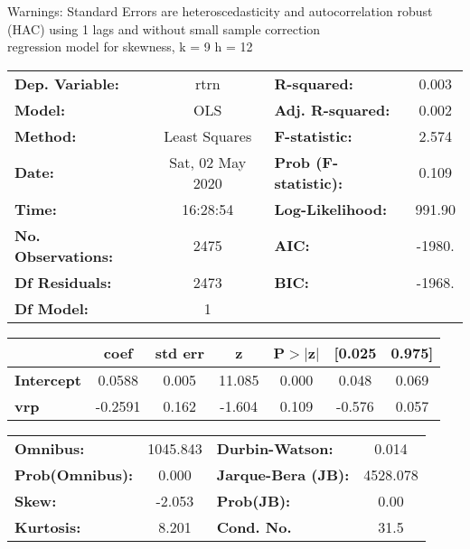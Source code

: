 Warnings: \newline
 [1] Standard Errors are heteroscedasticity and autocorrelation robust (HAC) using 1 lags and without small sample correction\\ 

regression model for skewness, k = 9 h = 12\begin{center}
\begin{tabular}{lclc}
\toprule
\textbf{Dep. Variable:}    &       rtrn       & \textbf{  R-squared:         } &     0.003   \\
\textbf{Model:}            &       OLS        & \textbf{  Adj. R-squared:    } &     0.002   \\
\textbf{Method:}           &  Least Squares   & \textbf{  F-statistic:       } &     2.574   \\
\textbf{Date:}             & Sat, 02 May 2020 & \textbf{  Prob (F-statistic):} &    0.109    \\
\textbf{Time:}             &     16:28:54     & \textbf{  Log-Likelihood:    } &    991.90   \\
\textbf{No. Observations:} &        2475      & \textbf{  AIC:               } &    -1980.   \\
\textbf{Df Residuals:}     &        2473      & \textbf{  BIC:               } &    -1968.   \\
\textbf{Df Model:}         &           1      & \textbf{                     } &             \\
\bottomrule
\end{tabular}
\begin{tabular}{lcccccc}
                   & \textbf{coef} & \textbf{std err} & \textbf{z} & \textbf{P$> |$z$|$} & \textbf{[0.025} & \textbf{0.975]}  \\
\midrule
\textbf{Intercept} &       0.0588  &        0.005     &    11.085  &         0.000        &        0.048    &        0.069     \\
\textbf{vrp}       &      -0.2591  &        0.162     &    -1.604  &         0.109        &       -0.576    &        0.057     \\
\bottomrule
\end{tabular}
\begin{tabular}{lclc}
\textbf{Omnibus:}       & 1045.843 & \textbf{  Durbin-Watson:     } &    0.014  \\
\textbf{Prob(Omnibus):} &   0.000  & \textbf{  Jarque-Bera (JB):  } & 4528.078  \\
\textbf{Skew:}          &  -2.053  & \textbf{  Prob(JB):          } &     0.00  \\
\textbf{Kurtosis:}      &   8.201  & \textbf{  Cond. No.          } &     31.5  \\
\bottomrule
\end{tabular}
\end{center}

